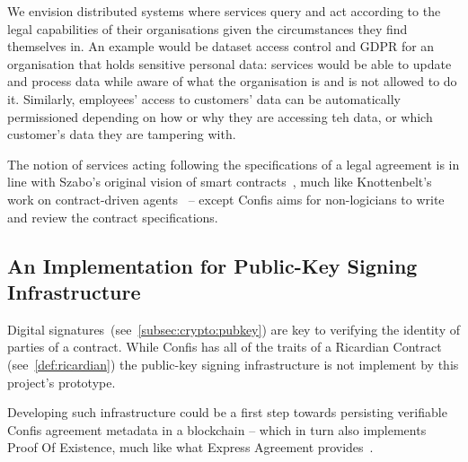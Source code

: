 We envision distributed systems where services query and act according to the legal capabilities of their organisations given the circumstances they find themselves in.
An example would be dataset access control and GDPR for an organisation that holds sensitive personal data: services would be able to update and process data while aware of what the organisation is and is not allowed to do it.
Similarly, employees' access to customers' data can be automatically permissioned depending on how or why they are accessing teh data, or which customer's data they are tampering with.

The notion of services acting following the specifications of a legal agreement is in line with Szabo's original vision of smart contracts~\cite{szabo1997smart-contracts}, much like Knottenbelt's work on contract-driven agents~\cite{knottenbeltContractDriven} -- except Confis aims for non-logicians to write and review the contract specifications.

\subsection{An Implementation for Public-Key Signing Infrastructure}\label{subsec:future:signing}

Digital signatures~(see~\autoref{subsec:crypto:pubkey}) are key to verifying the identity of parties of a contract.
While Confis has all of the traits of a Ricardian Contract (see~\autoref{def:ricardian}) the public-key signing infrastructure is not implement by this project's prototype.

Developing such infrastructure could be a first step towards persisting verifiable Confis agreement metadata in a blockchain -- which in turn also implements Proof Of Existence, much like what Express Agreement provides~\cite{expressAgreement}.
